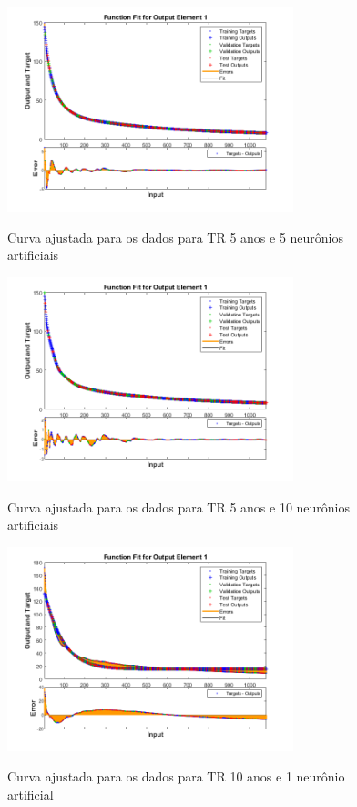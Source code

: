 \begin{figure}[h]
    \caption{Curva ajustada para os dados para TR 5 anos e 5 neurônios artificiais}
    \centering
    \includegraphics[width=0.74\textwidth]{Textuais/Figuras/NN/tr5-5neuronio.png}
    \label{fig:tr5-5n}
\end{figure}

\begin{figure}[h]
    \caption{Curva ajustada para os dados para TR 5 anos e 10 neurônios artificiais}
    \centering
    \includegraphics[width=0.74\textwidth]{Textuais/Figuras/NN/tr5-10neuronio.png}
    \label{fig:tr5-10n}
\end{figure}

\begin{figure}[h]
    \caption{Curva ajustada para os dados para TR 10 anos e 1 neurônio artificial}
    \centering
    \includegraphics[width=0.74\textwidth]{Textuais/Figuras/NN/tr10-1neuronio.png}
    \label{fig:tr10-1n}
\end{figure}

